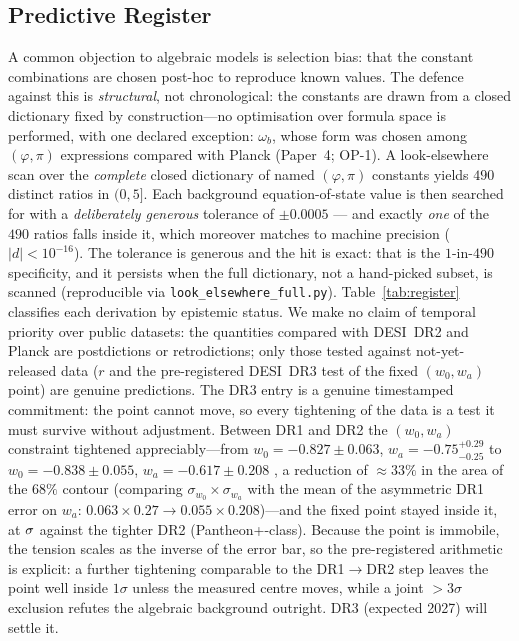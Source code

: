 \documentclass[12pt,a4paper]{article}
\begin{document}
\subsection{Predictive Register}
\label{sec:register}

A common objection to algebraic models is selection bias: that the constant
combinations are chosen post-hoc to reproduce known values.
The defence against this is \emph{structural}, not chronological: the constants are
drawn from a closed dictionary fixed by construction---no optimisation over formula
space is performed, with one declared exception: $\omega_b$, whose form was chosen among  $(\varphi,\pi)$ expressions compared with Planck (Paper~4; OP-1). A look-elsewhere scan over the \emph{complete} closed dictionary
of named $(\varphi,\pi)$ constants yields $490$ distinct ratios in $(0,5]$. Each
background equation-of-state value is then searched for with a \emph{deliberately
generous} tolerance of $\pm0.0005$ --- and exactly \emph{one} of the $490$ ratios
falls inside it, which moreover matches to machine precision ($|d|<10^{-16}$).
The tolerance is generous and the hit is exact: that is the $1$-in-$490$
specificity, and it persists when the full dictionary,
not a hand-picked subset, is scanned (reproducible via
\texttt{look\_elsewhere\_full.py}). Table~\ref{tab:register}
classifies each derivation by epistemic status. We make no claim of temporal priority
over public datasets: the quantities compared with DESI~DR2 and Planck are
postdictions or retrodictions; only those tested against not-yet-released data
($r$ and the pre-registered DESI~DR3 test of the fixed
$(w_0,w_a)$ point) are genuine predictions. The DR3 entry is a genuine
timestamped commitment: the point cannot move, so every tightening of the data
is a test it must survive without adjustment. Between DR1 and DR2 the
$(w_0,w_a)$ constraint tightened appreciably---from
$w_0=-0.827\pm0.063$, $w_a=-0.75^{+0.29}_{-0.25}$ \citep{DESI2024VI} to
$w_0=-0.838\pm0.055$, $w_a=-0.617\pm0.208$ \citep{AbdulKarim2025}, a reduction of
$\approx\!33\%$ in the area of the $68\%$ contour (comparing $\sigma_{w_0}\!\times\!\sigma_{w_a}$
with the mean of the asymmetric DR1 error on $w_a$: $0.063\times0.27\to0.055\times0.208$)---and the fixed point stayed
inside it, at $\val{p2_w0wa_ssee_ec26}\sigma$ against the
tighter DR2 (Pantheon+-class). Because the point is immobile, the tension scales
as the inverse of the error bar, so the pre-registered arithmetic is explicit:
a further tightening comparable to the DR1$\to$DR2 step leaves the point well
inside $1\sigma$ unless the measured centre moves, while a joint ${>}3\sigma$
exclusion refutes the algebraic background outright. DR3 (expected 2027) will settle it.
\end{document}
